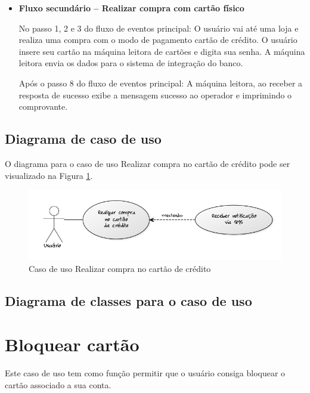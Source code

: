 \begin{itemize}
  \item \textbf{Fluxo secundário – Realizar compra com cartão físico}

  No passo 1, 2 e 3 do fluxo de eventos principal:
  \subitem O usuário vai até uma loja e realiza uma compra com o modo de pagamento cartão de crédito.
  \subitem O usuário insere seu cartão na máquina leitora de cartões e digita sua senha.
  \subitem A máquina leitora envia os dados para o sistema de integração do banco.

  Após o passo 8 do fluxo de eventos principal:
  \subitem A máquina leitora, ao receber a resposta de sucesso exibe a mensagem sucesso ao operador e imprimindo o comprovante.
\end{itemize}

\subsection{Diagrama de caso de uso}

O diagrama para o caso de uso Realizar compra no cartão de crédito pode ser visualizado na Figura \ref{cdu:compraCartaoCredito}.

\begin{figure}[!htb]
     \centering
     \includegraphics[scale=0.6]{diagramas/caso-de-uso/imagens/realizarCompraCartao.png}
     \caption{Caso de uso Realizar compra no cartão de crédito}
     \label{cdu:compraCartaoCredito}
\end{figure}

\subsection{Diagrama de classes para o caso de uso}

\section{Bloquear cartão}

Este caso de uso tem como função permitir que o usuário consiga bloquear o cartão associado a sua conta.


